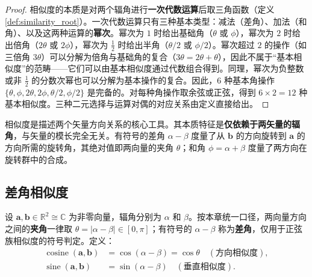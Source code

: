 \begin{proof}
相似度的本质是对两个辐角进行\textbf{一次代数运算}后取三角函数（定义 \ref{def:similarity_root}）。一次代数运算只有三种基本类型：减法（差角）、加法（和角）、以及这两种运算的\textbf{幂次}。幂次为 $1$ 时给出基础角（$\theta$ 或 $\phi$），幂次为 $2$ 时给出倍角（$2\theta$ 或 $2\phi$），幂次为 $\frac{1}{2}$ 时给出半角（$\theta/2$ 或 $\phi/2$）。幂次超过 $2$ 的操作（如三倍角 $3\theta$）可以分解为倍角与基础角的复合（$3\theta = 2\theta + \theta$），因此不属于“基本相似度”的范畴——它们可以由基本相似度通过代数组合得到。同理，幂次为负整数或非 $\frac{1}{2}$ 的分数次幂也可以分解为基本操作的复合。因此，$6$ 种基本角操作 $\{\theta, \phi, 2\theta, 2\phi, \theta/2, \phi/2\}$ 是完备的。对每种角操作取余弦或正弦，得到 $6 \times 2 = 12$ 种基本相似度。三种二元选择与运算对偶的对应关系由定义直接给出。
\end{proof}

\begin{definition}[相似度的本质]\label{def:similarity_essence}
相似度是描述两个矢量方向关系的核心工具。其本质特征是\textbf{仅依赖于两矢量的辐角}，与矢量的模长完全无关。有符号的差角 $\alpha - \beta$ 度量了从 $\mathbf{b}$ 的方向旋转到 $\mathbf{a}$ 的方向所需的旋转角，其绝对值即两向量的夹角 $\theta$；和角 $\phi = \alpha + \beta$ 度量了两方向在旋转群中的合成。
\end{definition}

\subsection{\texorpdfstring{差角相似度}{差角相似度}}

\begin{definition}[基础差角相似度]\label{def:basic_diff_similarity}
设 $\mathbf{a}, \mathbf{b} \in \mathbb{R}^2\cong\mathbb{C}$ 为非零向量，辐角分别为 $\alpha$ 和 $\beta$。按本章统一口径，两向量方向之间的\textbf{夹角}一律取 $\theta = \lvert\alpha-\beta\rvert \in [0,\pi]$；有符号的 $\alpha-\beta$ 称为\textbf{差角}，仅用于正弦族相似度的符号判定。定义：
\begin{align*}
\operatorname{cosine}(\mathbf{a}, \mathbf{b}) &= \cos(\alpha - \beta) = \cos\theta \quad (\text{方向相似度}), \\
\operatorname{sine}(\mathbf{a}, \mathbf{b}) &= \sin(\alpha - \beta) \quad (\text{垂直相似度}).
\end{align*}
\end{definition}

